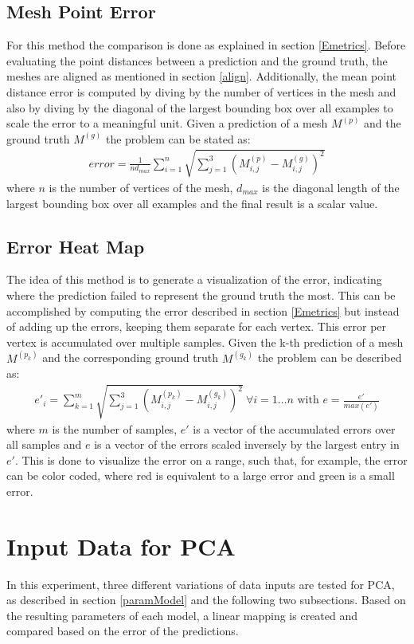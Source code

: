 \subsection{Mesh Point Error} %
\label{mpError}
For this method the comparison is done as explained in section \ref{Emetrics}. Before evaluating the point distances between a prediction and the ground truth, the meshes are aligned as mentioned in section \ref{align}. Additionally, the mean point distance error is computed by diving by the number of vertices in the mesh and also by diving by the diagonal of the largest bounding box over all examples to scale the error to a meaningful unit. Given a prediction of a mesh $M^{(p)}$ and the ground truth $M^{(g)}$ the problem can be stated as:
\begin{gather}
error = \frac{1}{nd_{max}}\sum_{i=1}^{n} \sqrt{\sum_{j=1}^3(M_{i,j}^{(p)} - M_{i,j}^{(g)})^2}
\end{gather}
where $n$ is the number of vertices of the mesh, $d_{max}$ is the diagonal length of the largest bounding box over all examples and the final result is a scalar value.
\subsection{Error Heat Map} %
\label{mhError}
The idea of this method is to generate a visualization of the error, indicating where the prediction failed to represent the ground truth the most. This can be accomplished by computing the error described in section \ref{Emetrics} but instead of adding up the errors, keeping them separate for each vertex. This error per vertex is accumulated over multiple samples. Given the  k-th prediction of a mesh $M^{(p_k)}$ and the corresponding ground truth $M^{(g_k)}$ the problem can be described as:
\begin{gather}
e'_{i} = \sum_{k=1}^{m} \sqrt{\sum_{j=1}^3(M_{i,j}^{(p_k)} - M_{i,j}^{(g_k)})^2} \  \forall i=1 \dots n \text{ with } e = \frac{e'}{max(e')}
\end{gather}
where $m$ is the number of samples, $e'$ is a vector of the accumulated errors over all samples and $e$ is a vector of the errors scaled inversely by the largest entry in $e'$. This is done to visualize the error on a range, such that, for example, the error can be color coded, where red is equivalent to a large error and green is a small error.
\section{Input Data for PCA}
In this experiment, three different variations of data inputs are tested for PCA, as described in section \ref{paramModel} and the following two subsections. Based on the resulting parameters of each model, a linear mapping is created and compared based on the error of the predictions.


